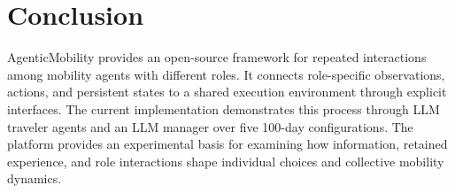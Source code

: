 \section{Conclusion}
\label{sec:conclusion}

AgenticMobility provides an open-source framework for repeated
interactions among mobility agents with different roles.
It connects role-specific observations, actions, and persistent
states to a shared execution environment through explicit
interfaces. The current implementation demonstrates this
process through LLM traveler agents and an LLM manager over five
100-day configurations. The platform provides an experimental basis for examining
how information, retained experience, and role interactions
shape individual choices and collective mobility dynamics.
